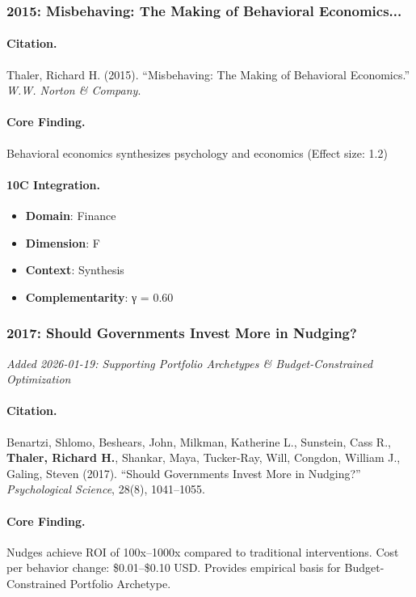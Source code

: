 \subsubsection{2015: Misbehaving: The Making of Behavioral Economics...}

\paragraph{Citation.}
Thaler, Richard H. (2015). ``Misbehaving: The Making of Behavioral Economics.''
\textit{W.W. Norton & Company}.

\paragraph{Core Finding.}
Behavioral economics synthesizes psychology and economics (Effect size: 1.2)

\paragraph{10C Integration.}
\begin{itemize}[nosep]
  \item \textbf{Domain}: Finance
  \item \textbf{Dimension}: F
  \item \textbf{Context}: Synthesis
  \item \textbf{Complementarity}: γ = 0.60
\end{itemize}

\subsubsection{2017: Should Governments Invest More in Nudging?}
\textit{Added 2026-01-19: Supporting Portfolio Archetypes \& Budget-Constrained Optimization}

\paragraph{Citation.}
Benartzi, Shlomo, Beshears, John, Milkman, Katherine L., Sunstein, Cass R., \textbf{Thaler, Richard H.}, Shankar, Maya, Tucker-Ray, Will, Congdon, William J., Galing, Steven (2017). ``Should Governments Invest More in Nudging?''
\textit{Psychological Science}, 28(8), 1041--1055.

\paragraph{Core Finding.}
Nudges achieve ROI of 100x--1000x compared to traditional interventions. Cost per behavior change: \$0.01--\$0.10 USD. Provides empirical basis for Budget-Constrained Portfolio Archetype.

